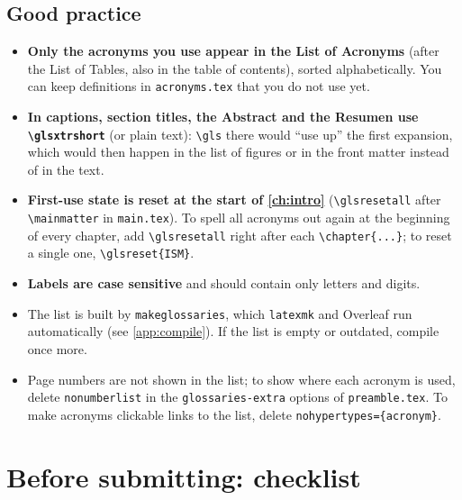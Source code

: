 \subsection*{Good practice}
\begin{itemize}
  \item \textbf{Only the acronyms you use appear in the List of Acronyms} (after the List of Tables, also in the table of contents), sorted alphabetically. You can keep definitions in \texttt{acronyms.tex} that you do not use yet.
  \item \textbf{In captions, section titles, the Abstract and the Resumen use \texttt{\textbackslash glsxtrshort}} (or plain text): \verb|\gls| there would ``use up'' the first expansion, which would then happen in the list of figures or in the front matter instead of in the text.
  \item \textbf{First-use state is reset at the start of \cref{ch:intro}} (\verb|\glsresetall| after \verb|\mainmatter| in \texttt{main.tex}). To spell all acronyms out again at the beginning of every chapter, add \verb|\glsresetall| right after each \verb|\chapter{...}|; to reset a single one, \verb|\glsreset{ISM}|.
  \item \textbf{Labels are case sensitive} and should contain only letters and digits.
  \item The list is built by \texttt{makeglossaries}, which \texttt{latexmk} and Overleaf run automatically (see \cref{app:compile}). If the list is empty or outdated, compile once more.
  \item Page numbers are not shown in the list; to show where each acronym is used, delete \texttt{nonumberlist} in the \texttt{glossaries-extra} options of \texttt{preamble.tex}. To make acronyms clickable links to the list, delete \texttt{nohypertypes=\{acronym\}}.
\end{itemize}

\section{Before submitting: checklist}\label{sec:checklist}

